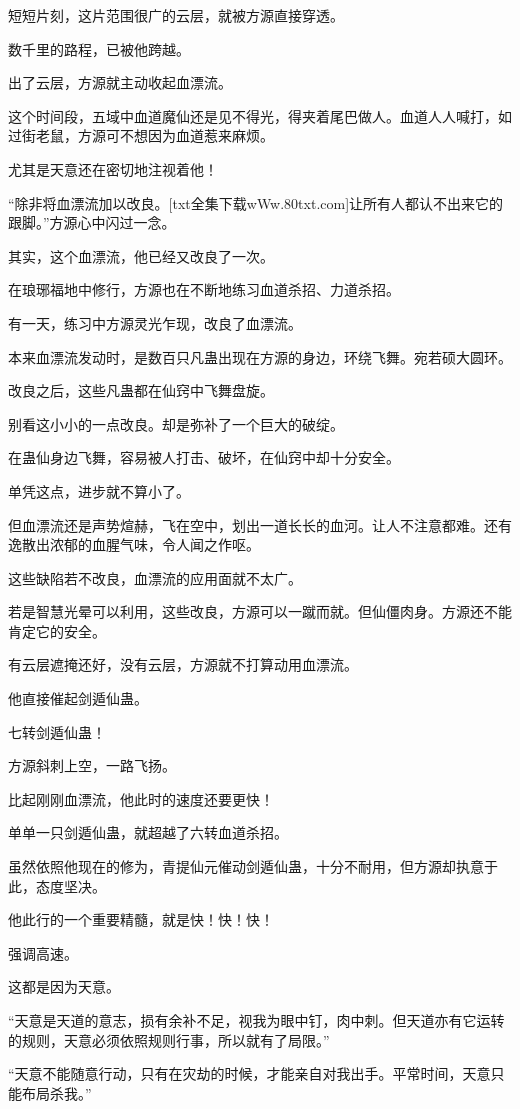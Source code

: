 \begin{this_body}
短短片刻，这片范围很广的云层，就被方源直接穿透。

数千里的路程，已被他跨越。

出了云层，方源就主动收起血漂流。

这个时间段，五域中血道魔仙还是见不得光，得夹着尾巴做人。血道人人喊打，如过街老鼠，方源可不想因为血道惹来麻烦。

尤其是天意还在密切地注视着他！

“除非将血漂流加以改良。[txt全集下载wWw.80txt.com]让所有人都认不出来它的跟脚。”方源心中闪过一念。

其实，这个血漂流，他已经又改良了一次。

在琅琊福地中修行，方源也在不断地练习血道杀招、力道杀招。

有一天，练习中方源灵光乍现，改良了血漂流。

本来血漂流发动时，是数百只凡蛊出现在方源的身边，环绕飞舞。宛若硕大圆环。

改良之后，这些凡蛊都在仙窍中飞舞盘旋。

别看这小小的一点改良。却是弥补了一个巨大的破绽。

在蛊仙身边飞舞，容易被人打击、破坏，在仙窍中却十分安全。

单凭这点，进步就不算小了。

但血漂流还是声势煊赫，飞在空中，划出一道长长的血河。让人不注意都难。还有逸散出浓郁的血腥气味，令人闻之作呕。

这些缺陷若不改良，血漂流的应用面就不太广。

若是智慧光晕可以利用，这些改良，方源可以一蹴而就。但仙僵肉身。方源还不能肯定它的安全。

有云层遮掩还好，没有云层，方源就不打算动用血漂流。

他直接催起剑遁仙蛊。

七转剑遁仙蛊！

方源斜刺上空，一路飞扬。

比起刚刚血漂流，他此时的速度还要更快！

单单一只剑遁仙蛊，就超越了六转血道杀招。

虽然依照他现在的修为，青提仙元催动剑遁仙蛊，十分不耐用，但方源却执意于此，态度坚决。

他此行的一个重要精髓，就是快！快！快！

强调高速。

这都是因为天意。

“天意是天道的意志，损有余补不足，视我为眼中钉，肉中刺。但天道亦有它运转的规则，天意必须依照规则行事，所以就有了局限。”

“天意不能随意行动，只有在灾劫的时候，才能亲自对我出手。平常时间，天意只能布局杀我。”


\end{this_body}
